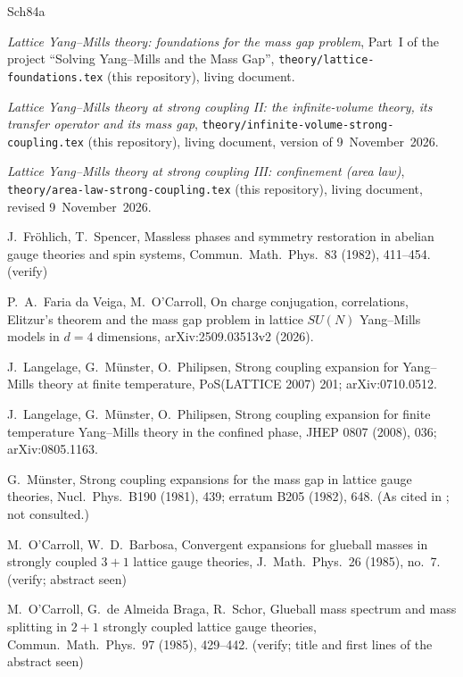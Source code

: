 \documentclass[11pt,a4paper]{article}
\theoremstyle{definition}
\theoremstyle{remark}
\begin{document}
\begin{thebibliography}{Sch84a}

\emph{Lattice Yang--Mills theory: foundations for the mass gap problem}, Part~I of the project ``Solving Yang--Mills and the Mass
Gap'', \texttt{theory/lattice-foundations.tex} (this repository), living document.

\emph{Lattice Yang--Mills theory at strong coupling II: the infinite-volume theory, its transfer operator and its mass gap},
\texttt{theory/infinite-volume-strong-coupling.tex} (this repository), living document, version of 9~November~2026.

\emph{Lattice Yang--Mills theory at strong coupling III: confinement (area law)}, \texttt{theory/area-law-strong-coupling.tex}
(this repository), living document, revised 9~November~2026.

J.~Fröhlich, T.~Spencer, Massless phases and symmetry restoration in abelian gauge theories and spin systems,
Commun.\ Math.\ Phys.\ 83 (1982), 411--454. (verify)

P.~A.~Faria da Veiga, M.~O'Carroll, On charge conjugation, correlations, Elitzur's theorem and the mass gap problem in lattice
$SU(N)$ Yang--Mills models in $d=4$ dimensions, arXiv:2509.03513v2 (2026).

J.~Langelage, G.~Münster, O.~Philipsen, Strong coupling expansion for Yang--Mills theory at finite temperature, PoS(LATTICE 2007) 201;
arXiv:0710.0512.

J.~Langelage, G.~Münster, O.~Philipsen, Strong coupling expansion for finite temperature Yang--Mills theory in the confined phase, JHEP 0807 (2008),
036; arXiv:0805.1163.

G.~Münster, Strong coupling expansions for the mass gap in lattice gauge theories, Nucl.\ Phys.\ B190 (1981), 439; erratum B205 (1982), 648. (As
cited in \cite{LMP08}; not consulted.)

M.~O'Carroll, W.~D.~Barbosa, Convergent expansions for glueball masses in strongly coupled $3+1$ lattice gauge theories,
J.\ Math.\ Phys.\ 26 (1985), no.~7. (verify; abstract seen)

M.~O'Carroll, G.~de Almeida Braga, R.~Schor, Glueball mass spectrum and mass splitting in $2+1$ strongly coupled lattice gauge
theories, Commun.\ Math.\ Phys.\ 97 (1985), 429--442. (verify; title and first lines of the abstract seen)


\end{thebibliography}
\end{document}

